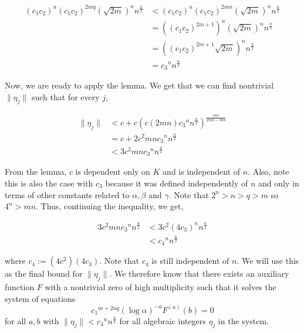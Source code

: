 \documentclass[a4paper, 11pt]{book}
\begin{document}
{\begin{align*}
    {\left(c_{1}c_{2}\right)}^{n} {\left(c_{1}c_{2}\right)}^{2mq}{\left(\sqrt{2m}\right)}^{n}n^{\frac{n}{2}} &< {(c_{1}c_{2})}^{n}{(c_{1}c_{2})}^{2mn}{\left(\sqrt{2m}\right)}^{n}n^{\frac{n}{2}} \\
                                                                                                             &= {\left({(c_{1}c_{2})}^{2m+1}\right)}^{n}{\left(\sqrt{2m}\right)}^{n}n^{\frac{n}{2}} \\
                                                                                                             &= {\left({(c_{1}c_{2})}^{2m+1}\sqrt{2m}\right)}^{n}{n}^{\frac{n}{2}} \\
                                                                                                             &= {c_3}^{n}n^{\frac{n}{2}}
\end{align*}

Now, we are ready to apply the lemma. We get that we can find nontrivial $\| \eta_j \|$ such that for every $j$, 

\begin{align*}
    \| \eta_j \| &< c + c{\left(c\left(2mn\right){c_3}^{n}n^{\frac{n}{2}}\right)}^{\frac{mn}{2mn - mn}} \\
                 &= c + 2c^{2}mn{c_{3}}^{n}n^{\frac{n}{2}} \\
                 &< 3{c}^{2}mn{c_{3}}^{n}{n}^{\frac{n}{2}} 
\end{align*}
}

From the lemma, $c$ is dependent only on $K$ and is independent of $n$. Also, note this is also the case with $c_3$ because it was defined independently of $n$ and only in terms of other constants related to $\alpha, \beta$ and $\gamma$. Note that $2^{n} > n > q > m$ so $4^{n} > mn$. Thus, continuing the inequality, we get,

\begin{align*}
    3{c}^{2}mn{c_{3}}^{n}{n}^{\frac{n}{2}} &< 3{c}^{2}{(4c_3)}^{n}n^{\frac{n}{2}} \\ 
                                           &< {c_4}^{n}n^{\frac{n}{2}}
\end{align*}

where $c_4 := \left(4{c}^{2}\right)\left(4c_3\right)$. Note  that $c_4$ is still independent of $n$. We will use this as the final bound for $\| \eta_j \|$. We therefore know that there exists an auxiliary function $F$ with a nontrivial zero of high multiplicity such that it solves the system of equations 
\[{c_1}^{m + 2nq} {(\log \alpha)}^{-a}F^{(a)}(b) = 0\]
for all $a,b$ with $\| \eta_j \| < {c_4}^{n}n^{\frac{n}{2}}$ for all algebraic integers $\eta_j$ in the system.
\end{document}
